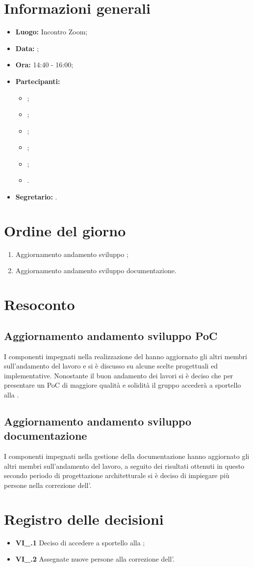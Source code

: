 \section{Informazioni generali}
\begin{itemize}
	\item \textbf{Luogo:} Incontro Zoom;
	\item \textbf{Data:} \Data;
	\item \textbf{Ora:} 14:40 - 16:00;
	\item \textbf{Partecipanti:}
	\begin{itemize}
		\item \BL{}; 
		\item \FF{};
		\item \MM{}; 
		\item \PC{};
		\item \TG{};
		\item \TL{}.
	\end{itemize} 
	\item \textbf{Segretario:} \TG{}.
\end{itemize}

\section{Ordine del giorno}
\begin{enumerate}
	\item Aggiornamento andamento sviluppo ;
	\item Aggiornamento andamento sviluppo documentazione.
\end{enumerate}

\section{Resoconto}
\subsection{Aggiornamento andamento sviluppo PoC}
I componenti impegnati nella realizzazione del  hanno aggiornato gli altri membri sull'andamento del lavoro e si è discusso su alcune scelte progettuali ed implementative. Nonostante il buon andamento dei lavori si è deciso che per presentare un PoC di maggiore qualità e solidità il gruppo accederà a sportello alla .
\subsection{Aggiornamento andamento sviluppo documentazione}
I componenti impegnati nella gestione della documentazione hanno aggiornato gli altri membri sull'andamento del lavoro, a seguito dei risultati ottenuti in questo secondo periodo di progettazione architetturale si è deciso di impiegare più persone nella correzione dell'\AdR{}.

\section{Registro delle decisioni}
\begin{itemize}
	\item \textbf{VI\_\Data.1} Deciso di accedere a sportello alla ;
	\item \textbf{VI\_\Data.2} Assegnate nuove persone alla correzione dell'\AdR{}.
\end{itemize}